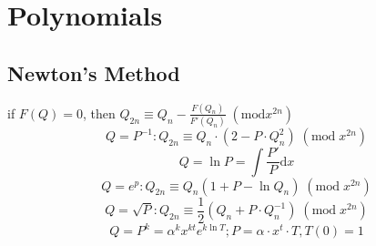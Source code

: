 \chapter{Polynomials}

\section{Newton's Method}
if $F(Q) = 0$, then $Q_{2n} \equiv Q_{n} - \frac{F(Q_{n})}{F'(Q_{n})}\;(\mathrm{mod} x^{2n})$ 
\[Q = P^{-1}: Q_{2n} \equiv Q_{n} \cdot (2 - P \cdot Q_{n}^2)\;(\mathrm{mod}\; x^{2n}) \]
\[Q = \ln{P} = \int\frac{P'}{P} \mathrm{d}x \]
\[Q = e^{p}: Q_{2n} \equiv Q_{n}(1 + P - \ln{Q_n})\;(\mathrm{mod}\; x^{2n}) \]
\[Q = \sqrt{P}: Q_{2n} \equiv \frac{1}{2}(Q_{n} + P \cdot Q_{n}^{-1})\;(\mathrm{mod}\; x^{2n}) \]
\[Q = P^{k} = \alpha^{k}x^{kt}e^{k\ln{T}}; P = \alpha \cdot x^{t} \cdot T, T(0) = 1 \]

